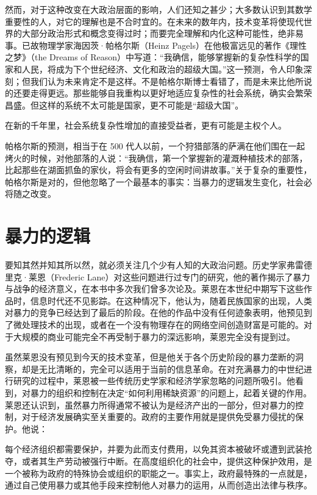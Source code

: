然而，对于这种改变在大政治层面的影响，人们还知之甚少；大多数认识到其数学重要性的人，对它的理解也是不合时宜的。在未来的数年内，技术变革将使现代世界的大部分政治形式和概念变得过时；而要完全理解和内化这种可能性，绝非易事。已故物理学家海因茨·帕格尔斯（Heinz Pagels）在他极富远见的著作《理性之梦》（the Dreams of Reason）中写道：“我确信，能够掌握新的复杂性科学的国家和人民，将成为下个世纪经济、文化和政治的超级大国。”这一预测，令人印象深刻；但我们认为未来肯定不是这样。不是帕格尔斯博士看错了，而是未来比他所说的还要走得更远。那些能够自我重构以更好地适应复杂性的社会系统，确实会繁荣昌盛。但这样的系统不太可能是国家，更不可能是“超级大国”。

在新的千年里，社会系统复杂性增加的直接受益者，更有可能是主权个人。

帕格尔斯的预测，相当于在 500 代人以前，一个狩猎部落的萨满在他们围在一起烤火的时候，对他部落的人说：“我确信，第一个掌握新的灌溉种植技术的部落，比起那些在湖面抓鱼的家伙，将会有更多的空闲时间讲故事。”关于复杂的重要性，帕格尔斯是对的，但他忽略了一个最基本的事实：当暴力的逻辑发生变化，社会必将随之改变。

\section{暴力的逻辑}
要知其然并知其所以然，就必须关注几个少有人知的大政治问题。历史学家弗雷德里克·莱恩（Frederic Lane）对这些问题进行过专门的研究，他的著作揭示了暴力与战争的经济意义，在本书中多次我们曾多次论及。莱恩在本世纪中期写下这些作品时，信息时代还不见影踪。在这种情况下，他认为，随着民族国家的出现，人类对暴力的竞争已经达到了最后的阶段。在他的作品中没有任何迹象表明，他预见到了微处理技术的出现，或者在一个没有物理存在的网络空间创造财富是可能的。对于大规模的商业可能完全不再受制于暴力的深远影响，莱恩完全没有提到过。

虽然莱恩没有预见到今天的技术变革，但是他关于各个历史阶段的暴力垄断的洞察，却是无比清晰的，完全可以适用于当前的信息革命。在对充满暴力的中世纪进行研究的过程中，莱恩被一些传统历史学家和经济学家忽略的问题所吸引。他看到，对暴力的组织和控制在决定“如何利用稀缺资源”的问题上，起着关键的作用。莱恩还认识到，虽然暴力所得通常不被认为是经济产出的一部分，但对暴力的控制，对于经济发展确实至关重要的。政府的主要作用就是提供免受暴力侵扰的保护。他说：

\begin{tcolorbox}
每个经济组织都需要保护，并要为此而支付费用，以免其资本被破坏或遭到武装抢夺，或者其生产劳动被强行中断。在高度组织化的社会中，提供这种保护效用，是一个被称为政府的特殊协会或组织的职能之一。事实上，政府最特殊的一点就是，通过自己使用暴力或其他手段来控制他人对暴力的运用，从而创造出法律与秩序。
\end{tcolorbox}

